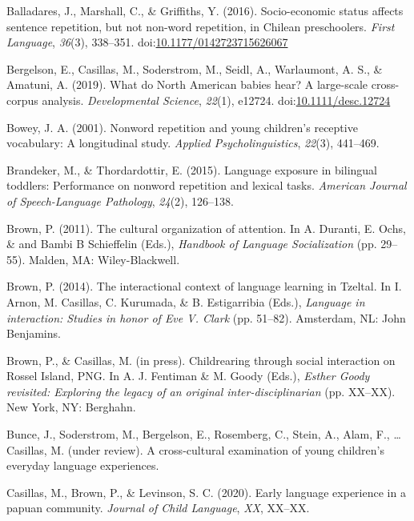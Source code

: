 \documentclass[english,,man,floatsintext]{apa6}
\begin{document}
\hypertarget{ref-balladares2016socio}{}
Balladares, J., Marshall, C., \& Griffiths, Y. (2016). Socio-economic
status affects sentence repetition, but not non-word repetition, in
Chilean preschoolers. \emph{First Language}, \emph{36}(3), 338--351.
doi:\href{https://doi.org/10.1177/0142723715626067}{10.1177/0142723715626067}

\hypertarget{ref-bergelsoncasillas2019what}{}
Bergelson, E., Casillas, M., Soderstrom, M., Seidl, A., Warlaumont, A.
S., \& Amatuni, A. (2019). What do North American babies hear? A
large-scale cross-corpus analysis. \emph{Developmental Science},
\emph{22}(1), e12724.
doi:\href{https://doi.org/10.1111/desc.12724}{10.1111/desc.12724}

\hypertarget{ref-bowey2001nonword}{}
Bowey, J. A. (2001). Nonword repetition and young children's receptive
vocabulary: A longitudinal study. \emph{Applied Psycholinguistics},
\emph{22}(3), 441--469.

\hypertarget{ref-brandeker2015language}{}
Brandeker, M., \& Thordardottir, E. (2015). Language exposure in
bilingual toddlers: Performance on nonword repetition and lexical tasks.
\emph{American Journal of Speech-Language Pathology}, \emph{24}(2),
126--138.

\hypertarget{ref-brown2011cultural}{}
Brown, P. (2011). The cultural organization of attention. In A. Duranti,
E. Ochs, \& and Bambi B Schieffelin (Eds.), \emph{Handbook of Language
Socialization} (pp. 29--55). Malden, MA: Wiley-Blackwell.

\hypertarget{ref-brown2014interactional}{}
Brown, P. (2014). The interactional context of language learning in
Tzeltal. In I. Arnon, M. Casillas, C. Kurumada, \& B. Estigarribia
(Eds.), \emph{Language in interaction: Studies in honor of Eve V. Clark}
(pp. 51--82). Amsterdam, NL: John Benjamins.

\hypertarget{ref-brownIPchildrearing}{}
Brown, P., \& Casillas, M. (in press). Childrearing through social
interaction on Rossel Island, PNG. In A. J. Fentiman \& M. Goody (Eds.),
\emph{Esther Goody revisited: Exploring the legacy of an original
inter-disciplinarian} (pp. XX--XX). New York, NY: Berghahn.

\hypertarget{ref-bunceURcrosscultural}{}
Bunce, J., Soderstrom, M., Bergelson, E., Rosemberg, C., Stein, A.,
Alam, F., \ldots{} Casillas, M. (under review). A cross-cultural
examination of young children's everyday language experiences.

\hypertarget{ref-casillas2020early}{}
Casillas, M., Brown, P., \& Levinson, S. C. (2020). Early language
experience in a papuan community. \emph{Journal of Child Language},
\emph{XX}, XX--XX.
\end{document}

